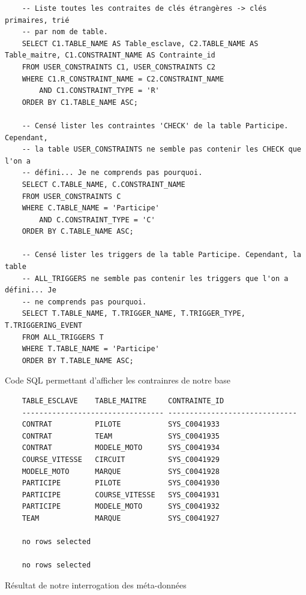\documentclass[12pt,a4paper]{article}
\newenvironment{code}{\captionsetup{type=listing}}{}
\begin{document}
\begin{code}
    \begin{verbatim}
    -- Liste toutes les contraites de clés étrangères -> clés primaires, trié
    -- par nom de table.
    SELECT C1.TABLE_NAME AS Table_esclave, C2.TABLE_NAME AS Table_maitre, C1.CONSTRAINT_NAME AS Contrainte_id
    FROM USER_CONSTRAINTS C1, USER_CONSTRAINTS C2
    WHERE C1.R_CONSTRAINT_NAME = C2.CONSTRAINT_NAME
        AND C1.CONSTRAINT_TYPE = 'R'
    ORDER BY C1.TABLE_NAME ASC;

    -- Censé lister les contraintes 'CHECK' de la table Participe. Cependant,
    -- la table USER_CONSTRAINTS ne semble pas contenir les CHECK que l'on a
    -- défini... Je ne comprends pas pourquoi.
    SELECT C.TABLE_NAME, C.CONSTRAINT_NAME
    FROM USER_CONSTRAINTS C
    WHERE C.TABLE_NAME = 'Participe'
        AND C.CONSTRAINT_TYPE = 'C'
    ORDER BY C.TABLE_NAME ASC;

    -- Censé lister les triggers de la table Participe. Cependant, la table
    -- ALL_TRIGGERS ne semble pas contenir les triggers que l'on a défini... Je
    -- ne comprends pas pourquoi.
    SELECT T.TABLE_NAME, T.TRIGGER_NAME, T.TRIGGER_TYPE, T.TRIGGERING_EVENT
    FROM ALL_TRIGGERS T
    WHERE T.TABLE_NAME = 'Participe'
    ORDER BY T.TABLE_NAME ASC;
    \end{verbatim}
    \caption{Code SQL permettant d'afficher les contrainres de notre base}
    \label{lst.metadata}
\end{code}

\begin{code}
    \begin{verbatim}
    TABLE_ESCLAVE    TABLE_MAITRE     CONTRAINTE_ID
    --------------------------------- ------------------------------
    CONTRAT          PILOTE           SYS_C0041933
    CONTRAT          TEAM             SYS_C0041935
    CONTRAT          MODELE_MOTO      SYS_C0041934
    COURSE_VITESSE   CIRCUIT          SYS_C0041929
    MODELE_MOTO      MARQUE           SYS_C0041928
    PARTICIPE        PILOTE           SYS_C0041930
    PARTICIPE        COURSE_VITESSE   SYS_C0041931
    PARTICIPE        MODELE_MOTO      SYS_C0041932
    TEAM             MARQUE           SYS_C0041927

    no rows selected
    
    no rows selected
    \end{verbatim}
    \caption{Résultat de notre interrogation des méta-données}
    \label{lst.metadata.res}
\end{code}
\end{document}
